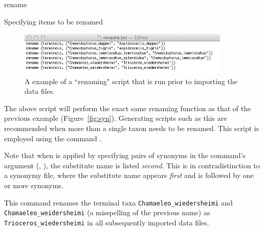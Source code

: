 \begin{command}{rename}{}
\begin{arguments}
\begin{argumentgroup}{Specifying items to be renamed}
{\begin{figure}[th!]
\begin{center}
\includegraphics[width=0.9\textwidth]{doc/figures/rename.jpg}
\end{center}
\caption{A example of a ``renaming" script that is run prior to importing the data files.}
\label{fig:rename}
\end{figure}


The above script will perform the exact same renaming function as that of the previous example 
(Figure~\ref{fig:syn}). Generating scripts such as this are recommended when more than a single taxon 
needs to be renamed. This script is employed using the command . %
}
{}    

\begin{statement}
Note that when  is applied by specifying pairs of
synonyms in the command's argument (\poystring, \poystring),
the substitute name is listed \emph{second}. This is in contradistinction to 
a synonymy file, where the substitute name 
appears \emph{first} and is followed by one or more synonyms.
\end{statement}
\end{argumentgroup}

\end{arguments}

\begin{poyexamples}



{This command renames the terminal taxa \texttt{Chamaeleo\_wiedersheimi} 
and \texttt{Chamaeleo\_weidersheimi} (a misspelling of the previous name) as 
\texttt{Trioceros\_wiedersheimi} in all subsequently imported data files.}

\end{poyexamples}

\end{command}

